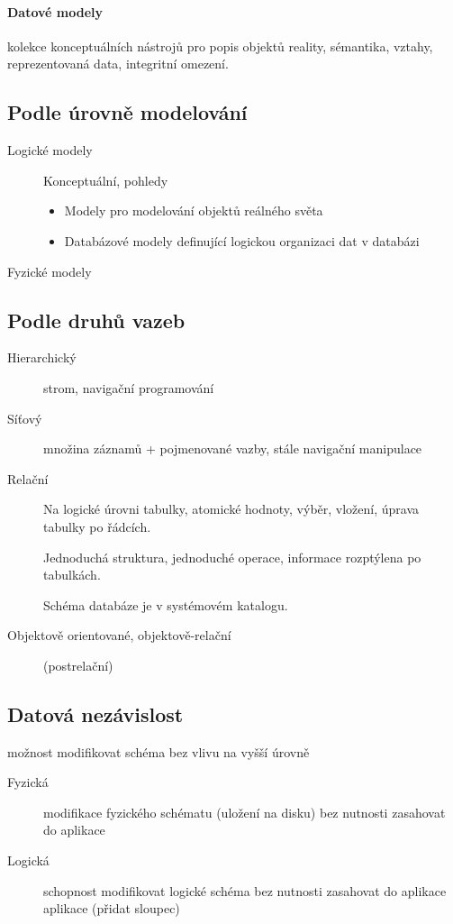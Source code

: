 \documentclass[a4paper, 11pt]{report}
\begin{document}
\paragraph{Datové modely}
kolekce konceptuálních nástrojů pro popis objektů reality, sémantika, vztahy, reprezentovaná data, integritní omezení.

\subsection{Podle úrovně modelování}
\begin{description}
	\item[Logické modely] Konceptuální, pohledy
	\begin{itemize}
		\item Modely pro modelování objektů reálného světa
		\item Databázové modely definující logickou organizaci dat v databázi
	\end{itemize}
	\item[Fyzické modely]
\end{description}

\subsection{Podle druhů vazeb}
\begin{description}
	\item[Hierarchický] strom, navigační programování
	\item[Síťový] množina záznamů + pojmenované vazby, stále navigační manipulace
	\item[Relační] Na logické úrovni tabulky, atomické hodnoty, výběr, vložení, úprava tabulky po řádcích.
	
	Jednoduchá struktura, jednoduché operace, informace rozptýlena po tabulkách.
	
	Schéma databáze je v systémovém katalogu.
	
	\item[Objektově orientované, objektově-relační] (postrelační)
\end{description}

\subsection{Datová nezávislost}
možnost modifikovat schéma bez vlivu na vyšší úrovně
\begin{description}
	\item[Fyzická] modifikace fyzického schématu (uložení na disku) bez nutnosti zasahovat do aplikace
	\item[Logická] schopnost modifikovat logické schéma bez nutnosti zasahovat do aplikace aplikace (přidat sloupec)
\end{description}
\end{document}
